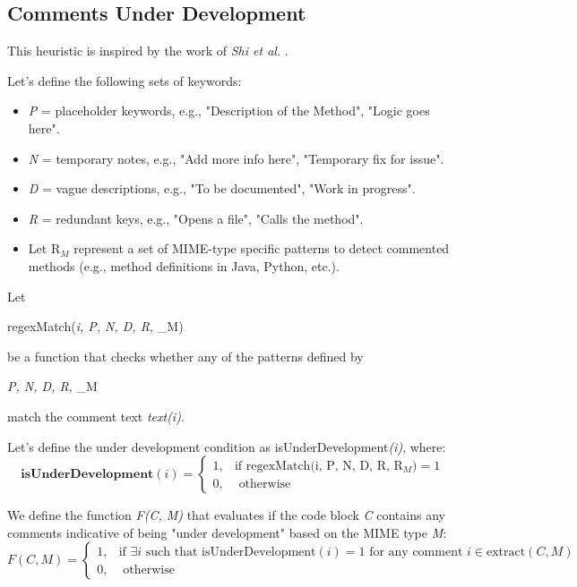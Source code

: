 \subsection{Comments Under Development}
This heuristic is inspired by the work of \textit{Shi et al.} \cite{buildingRock}.

\noindent Let's define the following sets of keywords:
	\begin{itemize}
		\item \textit{P} = placeholder keywords, e.g., "Description of the Method", "Logic goes here".
		\item \textit{N} = temporary notes, e.g., "Add more info here", "Temporary fix for issue".
		\item \textit{D} = vague descriptions, e.g., "To be documented", "Work in progress".
		\item \textit{R} = redundant keys, e.g., "Opens a file", "Calls the method".
		\item Let $\mathrm{R}_{M}$ represent a set of MIME-type specific patterns to detect commented methods (e.g., method definitions in Java, Python, etc.).
	\end{itemize}
	
\noindent Let\begin{math*}
	regexMatch(\textit{i, P, N, D, R, } _{M})
\end{math*} be a function that checks whether any of the patterns defined by \begin{math*}\textit{P, N, D, R, } _{M} \end{math*} match the comment text \textit{text(i)}.

\noindent Let's define the under development condition as isUnderDevelopment\textit{(i)}, where:
\begin{equation*}
	\textbf{isUnderDevelopment}(i) = \begin{cases}
		1, & \text{if } \text{regexMatch(i, P, N, D, R, }  \mathrm{R}_{M}) = 1 \\
		0, & \text{ otherwise}
	\end{cases}
\end{equation*}

\noindent We define the function \textit{F(C, M)} that evaluates if the code block \textit{C} contains any comments indicative of being "under development" based on the MIME type \textit{M}:
\begin{equation*}
	F(C, M) = \begin{cases}
		1, & \text{if } \exists i \text{ such that } \text{isUnderDevelopment}(i) = 1 \text{ for any comment } i \in \text{extract}(C, M) \\
		0, & \text{ otherwise}
	\end{cases}
\end{equation*}

